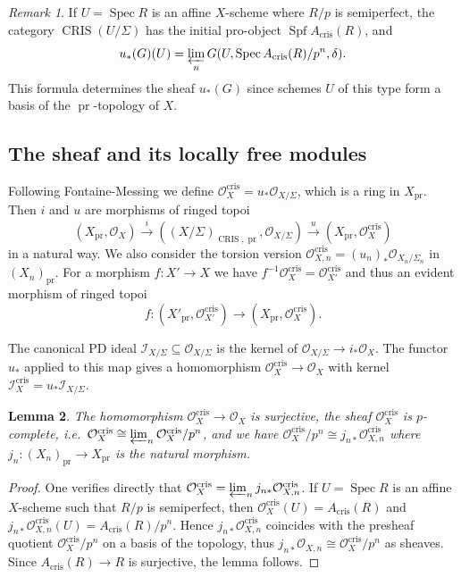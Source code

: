 \documentclass[a4paper,11pt]{article}
\theoremstyle{plain}
\newtheorem{Lemma}{Lemma}
\theoremstyle{definition}
\theoremstyle{remark}
\newtheorem{Remark}[Lemma]{Remark}
\theoremstyle{definition}
\numberwithin{Lemma}{section}
\numberwithin{Subpoint}{Lemma}
\numberwithin{equation}{section}
\newcommand{\III}{\mathcal{I}}
\newcommand{\OOO}{\mathcal{O}}
\DeclareMathOperator{\CRIS}{CRIS}
\DeclareMathOperator{\Spec}{Spec}
\DeclareMathOperator{\Spf}{Spf}
\DeclareMathOperator{\cris}{cris}
\newcommand{\nameoftop}{{\operatorname{pr}}}
\newcommand{\chang}[1]{{#1}}
\begin{document}
\begin{Remark}
If $U=\Spec R$ is an affine $X$-scheme where $R/p$ is semiperfect, 
the category $\CRIS(U/\Sigma)$ has the initial pro-object $\Spf A_{\cris}(R)$,
and 
\[
u_*(G)(U)=\varprojlim_nG(U,\Spec A_{\cris}(R)/p^n,\delta).
\]
This formula determines the sheaf $u_*(G)$
since schemes $U$ of this type form a basis of the $\nameoftop$-topology of $X$.
\end{Remark}

\subsection*{The sheaf \boldmath{$\OOO_X^{\cris}$} and its locally free modules}

Following Fontaine-Messing \cite{Fontaine-Messing} 
we define $\OOO_X^{\cris}=u_*\OOO_{X/\Sigma}$,
which is a ring in $X_{\nameoftop}$.
Then $i$ and $u$ are morphisms of ringed topoi
\[
(X_{\nameoftop},\OOO_X)
\xrightarrow {\;i\;}
((X/\Sigma)_{\CRIS,\nameoftop},\OOO_{X/\Sigma})
\xrightarrow {\;u\;}
(X_{\nameoftop},\OOO_X^{\cris})
\]
in a natural way.
We also consider the torsion version
$\OOO_{X,n}^{\cris}=(u_n)_*\OOO_{X_n/\Sigma_n}$ in $(X_n)_\nameoftop$.
For a morphism $f:X'\to X$ we have 
$f^{-1}\OOO_X^{\cris}=\OOO_{X'}^{\cris}$
and thus an evident morphism of ringed topoi
\[
f:(X'_{\nameoftop},\OOO_{X'}^{\cris})\to
(X_{\nameoftop},\OOO_X^{\cris}).
\]

The canonical PD ideal $\III_{X/\Sigma}\subseteq\OOO_{X/\Sigma}$ 
is the kernel of $\OOO_{X/\Sigma}\to i_*\OOO_X$.
The functor $u_*$ applied to this map gives a homomorphism
$\OOO_X^{\cris}\to\OOO_X$ with kernel $\III_X^{\cris}=u_*\III_{X/\Sigma}$.

\begin{Lemma}
The homomorphism $\OOO_X^{\cris}\to\OOO_X$ is surjective,
the sheaf $\OOO_X^{\cris}$ is \chang{$p$-complete},
i.e.\ $\OOO_X^{\cris}\cong\varprojlim_n\OOO_X^{\cris}/p^n$, 
and we have $\OOO_X^{\cris}/p^n\cong j_{n*}\OOO_{X,n}^{\cris}$
where $j_n:(X_n)_\nameoftop\to X_\nameoftop$ is the natural morphism.
\end{Lemma}

\begin{proof}
One verifies directly that $\OOO_X^{\cris}=\varprojlim_nj_{n*}\OOO_{X,n}^{\cris}$.
If $U=\Spec R$ is an affine $X$-scheme such that $R/p$ is semiperfect,
then $\OOO_X^{\cris}(U)=A_{\cris}(R)$
and $j_{n*}\OOO_{X,n}^{\cris}(U)=A_{\cris}(R)/p^n$. 
Hence $j_{n*}\OOO_{X,n}^{\cris}$ coincides with the presheaf quotient
$\OOO_X^{\cris}/p^n$ on a basis of the topology,
thus $j_{n*}\OOO_{X,n}\cong \OOO_X^{\cris}/p^n$ as sheaves. 
Since $A_{\cris}(R)\to R$ is surjective, the lemma follows.
\end{proof}
\end{document}
